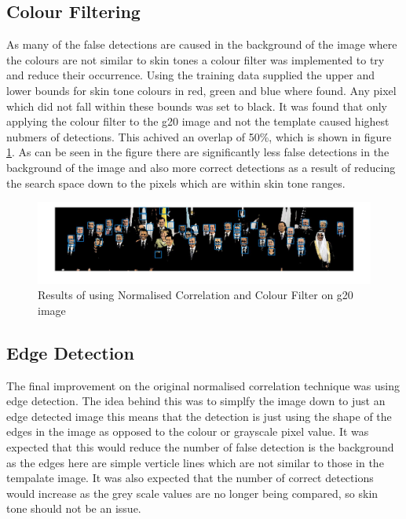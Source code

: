 \documentclass{article}
\begin{document}
\subsection{Colour Filtering}

As many of the false detections are caused in the background of the image where
the colours are not similar to skin tones a colour filter was implemented to try
and reduce their occurrence. Using the training data supplied the upper and lower
bounds for skin tone colours in red, green and blue where found. Any pixel which
did not fall within these bounds was set to black. It was found that only applying
the colour filter to the g20 image and not the template caused highest nubmers of
detections. This achived an overlap of 50\%, which is shown in figure \ref{fig:colourfilt}.
As can be seen in the figure there are significantly less false detections in the
background of the image and also more correct detections as a result of reducing
the search space down to the pixels which are within skin tone ranges.\\

\begin{figure}[H]
  \includegraphics[width=\linewidth]{colourfilt.jpg}
  \caption{Results of using Normalised Correlation and Colour Filter on g20 image}
  \label{fig:colourfilt}
\end{figure}

\subsection{Edge Detection}

The final improvement on the original normalised correlation technique was using
edge detection. The idea behind this was to simplfy the image down to just an edge
detected image this means that the detection is just using the shape of the edges
in the image as opposed to the colour or grayscale pixel value. It was expected
that this would reduce the number of false detection is the background as the edges
here are simple verticle lines which are not similar to those in the tempalate image.
It was also expected that the number of correct detections would increase as the grey
scale values are no longer being compared, so skin tone should not be an issue.\\
\end{document}
